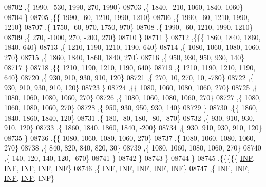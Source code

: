 \begin{DoxyCode}
08702     ,\{  1990,  -530,  1990,   270,  1990\}
08703     ,\{  1840,  -210,  1060,  1840,  1060\}
08704     \}
08705    ,\{\{  1990,   -60,  1210,  1990,  1210\}
08706     ,\{  1990,   -60,  1210,  1990,  1210\}
08707     ,\{  1750,   -60,   970,  1750,   970\}
08708     ,\{  1990,   -60,  1210,  1990,  1210\}
08709     ,\{   270, -1000,   270,  -200,   270\}
08710     \}
08711    \}
08712   ,\{\{\{  1860,  1840,  1860,  1840,   640\}
08713     ,\{  1210,  1190,  1210,  1190,   640\}
08714     ,\{  1080,  1060,  1080,  1060,   270\}
08715     ,\{  1860,  1840,  1860,  1840,   270\}
08716     ,\{   950,   930,   950,   930,   140\}
08717     \}
08718    ,\{\{  1210,  1190,  1210,  1190,   640\}
08719     ,\{  1210,  1190,  1210,  1190,   640\}
08720     ,\{   930,   910,   930,   910,   120\}
08721     ,\{   270,    10,   270,    10,  -780\}
08722     ,\{   930,   910,   930,   910,   120\}
08723     \}
08724    ,\{\{  1080,  1060,  1080,  1060,   270\}
08725     ,\{  1080,  1060,  1080,  1060,   270\}
08726     ,\{  1080,  1060,  1080,  1060,   270\}
08727     ,\{  1080,  1060,  1080,  1060,   270\}
08728     ,\{   950,   930,   950,   930,   140\}
08729     \}
08730    ,\{\{  1860,  1840,  1860,  1840,   120\}
08731     ,\{   180,   -80,   180,   -80,  -870\}
08732     ,\{   930,   910,   930,   910,   120\}
08733     ,\{  1860,  1840,  1860,  1840,  -200\}
08734     ,\{   930,   910,   930,   910,   120\}
08735     \}
08736    ,\{\{  1080,  1060,  1080,  1060,   270\}
08737     ,\{  1080,  1060,  1080,  1060,   270\}
08738     ,\{   840,   820,   840,   820,    30\}
08739     ,\{  1080,  1060,  1080,  1060,   270\}
08740     ,\{   140,   120,   140,   120,  -670\}
08741     \}
08742    \}
08743   \}
08744  \}
08745 ,\{\{\{\{\{   \hyperlink{constants_8h_a12c2040f25d8e3a7b9e1c2024c618cb6}{INF},   \hyperlink{constants_8h_a12c2040f25d8e3a7b9e1c2024c618cb6}{INF},   \hyperlink{constants_8h_a12c2040f25d8e3a7b9e1c2024c618cb6}{INF},   \hyperlink{constants_8h_a12c2040f25d8e3a7b9e1c2024c618cb6}{INF},   INF\}
08746     ,\{   \hyperlink{constants_8h_a12c2040f25d8e3a7b9e1c2024c618cb6}{INF},   \hyperlink{constants_8h_a12c2040f25d8e3a7b9e1c2024c618cb6}{INF},   \hyperlink{constants_8h_a12c2040f25d8e3a7b9e1c2024c618cb6}{INF},   \hyperlink{constants_8h_a12c2040f25d8e3a7b9e1c2024c618cb6}{INF},   INF\}
08747     ,\{   \hyperlink{constants_8h_a12c2040f25d8e3a7b9e1c2024c618cb6}{INF},   \hyperlink{constants_8h_a12c2040f25d8e3a7b9e1c2024c618cb6}{INF},   \hyperlink{constants_8h_a12c2040f25d8e3a7b9e1c2024c618cb6}{INF},   \hyperlink{constants_8h_a12c2040f25d8e3a7b9e1c2024c618cb6}{INF},   INF\}

\end{DoxyCode}
